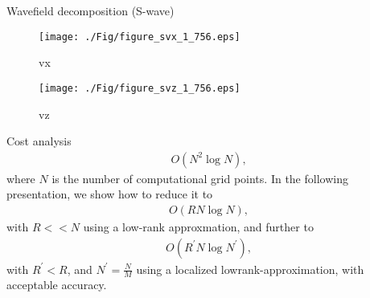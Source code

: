 \documentclass[aspectratio=169]{beamer}
\begin{document}
\begin{frame}{Wavefield decomposition (S-wave)}
   \begin{figure}[ht]
        \begin{minipage}[b]{0.45\linewidth}
            \centering
  	    \texttt{[image: ./Fig/figure\_svx\_1\_756.eps]}
            \caption{vx}
        \end{minipage}
        \hspace{0.5cm}
        \begin{minipage}[b]{0.45\linewidth}
            \centering
            \texttt{[image: ./Fig/figure\_svz\_1\_756.eps]}
            \caption{vz}
        \end{minipage}
    \end{figure}
\end{frame}
\begin{frame}{Cost analysis}
\begin{eqnarray*}
O(N^2\log N),
\end{eqnarray*}
where $N$ is the number of computational grid points. In the following presentation, \newline we show how to reduce it to
\begin{eqnarray*}
 O(RN\log N),
\end{eqnarray*}
with $R<<N$ using a low-rank approxmation, and further to 
\begin{eqnarray*}
O(R^\prime N \log N^\prime),
\end{eqnarray*}
with $R^\prime<R$, and $N^\prime=\frac{N}{M}$ using a localized lowrank-approximation, with acceptable \newline accuracy.
\end{frame}
\end{document}
